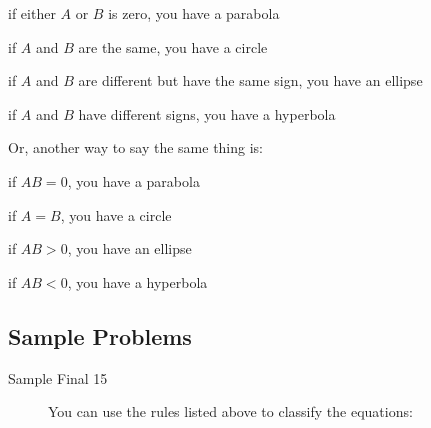 \documentclass[fleqn,addpoints]{exam}
\begin{document}
\begin{itemize*}
\item if either $A$ or $B$ is zero, you have a parabola
\item if $A$ and $B$ are the same, you have a circle
\item if $A$ and $B$ are different but have the same sign, you have an ellipse
\item if $A$ and $B$ have different signs, you have a hyperbola
\end{itemize*}

Or, another way to say the same thing is:
\begin{itemize*}
\item if $AB = 0$, you have a parabola
\item if $A = B$, you have a circle
\item if $AB > 0$, you have an ellipse
\item if $AB < 0$, you have a hyperbola
\end{itemize*}

\subsection{Sample Problems}

\begin{description}

\item[Sample Final 15]

You can use the rules listed above to classify the equations:


\end{description}
\end{document}
